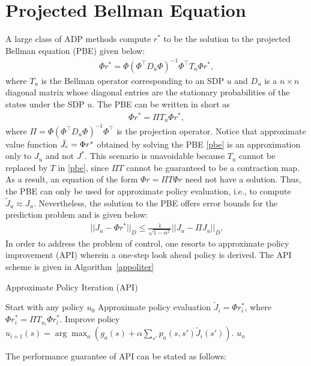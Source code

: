 \section{Projected Bellman Equation}
A large class of ADP methods compute $r^*$ to be the solution to the projected Bellman equation (PBE) given below:
\begin{align}\label{pbelong}
\Phi r^*=\Phi (\Phi ^\top D_u\Phi)^{-1}\Phi^\top T_u\Phi r^*,
\end{align}
where $T_u$ is the Bellman operator corresponding to an SDP $u$ and $D_u$ is a $n\times n$ diagonal matrix whose diagonal entries are the stationary probabilities of the states under the SDP $u$. The PBE can be written in short as 
\begin{align}\label{pbe}
\Phi r^*=\Pi T_u \Phi r^*,
\end{align} where $\Pi=\Phi (\Phi ^\top D_u\Phi)^{-1}\Phi^\top$ is the projection operator. Notice that approximate value function $\tilde{J}_c=\Phi r^*$ obtained by solving the PBE \eqref{pbe} is an approximation only to $J_u$ and not $J^*$. This scenario is unavoidable because $T_u$ cannot be replaced by $T$ in \eqref{pbe}, since $\Pi T$ cannot be guaranteed to be a contraction map. As a result, an equation of the form $\Phi r=\Pi T\Phi r$ need not have a solution. Thus, the PBE can only be used for approximate policy evaluation, i.e., to compute $\tilde{J}_u\approx J_u$. Nevertheless, the solution to the PBE offers error bounds for the prediction problem and is given below:
\begin{align}\label{errbnd}
||J_u-\Phi r^*||_D \leq \frac{1}{\sqrt{1-\alpha^2}}||J_u-\Pi J_u||_D.
\end{align}
In order to address the problem of control, one resorts to approximate policy improvement (API) wherein a one-step look ahead policy is derived. The API scheme is given in Algorithm~\ref{appoliter}
\FloatBarrier 
\begin{algorithm}[H]
\caption{Approximate Policy Iteration (API)}
\begin{algorithmic}[1]
\STATE Start with any policy $u_0$
\STATE \label{appeval}Approximate policy evaluation $\tilde{J}_{i}= \Phi r^*_i$, where $\Phi r^*_i=\Pi T_{u_i}\Phi r^*_i$.
\STATE Improve policy $u_{i+1}(s)=\arg\max_a (g_a(s)+\alpha\sum_{s'}p_a(s,s')\tilde{J}_{i}(s'))$.
\ENDFOR
\RETURN $u_n$
\end{algorithmic}
\label{appoliter}
\end{algorithm}
The performance guarantee of API can be stated as follows:
